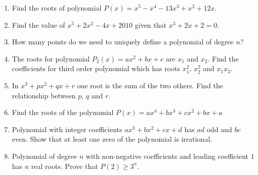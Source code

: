 \documentclass{article}
\begin{document}
\begin{enumerate}

\item
Find the roots of polynomial $P(x)=x^5-x^4-13x^3+x^2+12x$.

\item %
Find the value of $x^5+2x^2-4x+2010$ given that $x^3+2x+2=0$.

\item
How many points do we need to uniquely define a polynomial of degree $n$?

\item
The roots for polynomial $P_2(x)=ax^2+bx+c$ are $x_1$ and $x_2$. Find the coefficients for third order polynomial which has roots $x_1^2$, $x_2^2$ and $x_1x_2$.

\item %
In $x^3+px^2+qx+r$ one root is the sum of the two others. Find the relationship between $p$, $q$ and $r$. 

\item %
Find the roots of the polynomial $P(x)=ax^4+bx^3+cx^2+bx+a$


\item %
Polynomial with integer coefficients $ax^3+bx^2+cx+d$ has $ad$ odd and $bc$ even. Show that at least one zero of the polynomial is irrational.

\item %
Polynomial of degree $n$ with non-negative coefficients and leading coefficient $1$ has $n$ real roots. Prove that $P(2)\geq 3^n$. 


\end{enumerate}
\end{document}
